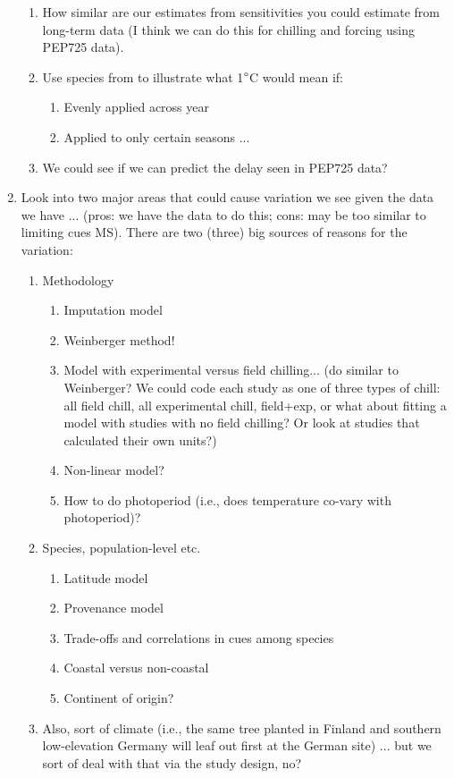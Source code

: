 \documentclass[11pt,letterpaper]{article}
\begin{document}
\begin{enumerate}
\begin{enumerate}
\item How similar are our estimates from sensitivities you could estimate from long-term data (I think we can do this for chilling and forcing using PEP725 data).
\item Use species from \citep{fu2015} to illustrate what 1$\degree$C would mean if:
\begin{enumerate}
\item Evenly applied across year
\item Applied to only certain seasons ... 
\end{enumerate}
\item We could see if we can predict the delay seen in PEP725 data? 
\end{enumerate}
\item Look into two major areas that could cause variation we see given the data we have ... (pros: we have the data to do this; cons: may be too similar to limiting cues MS). There are two (three) big sources of reasons for the variation:
\begin{enumerate}
\item Methodology
\begin{enumerate}
\item Imputation model
\item Weinberger method! 
\item Model with experimental versus field chilling... (do similar to Weinberger? We could code each study as one of three types of chill: all field chill, all experimental chill, field+exp, or what about fitting a model with studies with no field chilling? Or look at studies that calculated their own units?)
\item Non-linear model?
\item How to do photoperiod (i.e., does temperature co-vary with photoperiod)?
\end{enumerate}
\item Species, population-level etc.
\begin{enumerate}
\item Latitude model
\item Provenance model
\item Trade-offs and correlations in cues among species 
\item Coastal versus non-coastal
\item Continent of origin?
\end{enumerate}
\item Also, sort of climate (i.e., the same tree planted in Finland and southern low-elevation Germany will leaf out first at the German site) ... but we sort of deal with that via the study design, no?
\end{enumerate}
\end{enumerate}



\newpage


\end{document}
